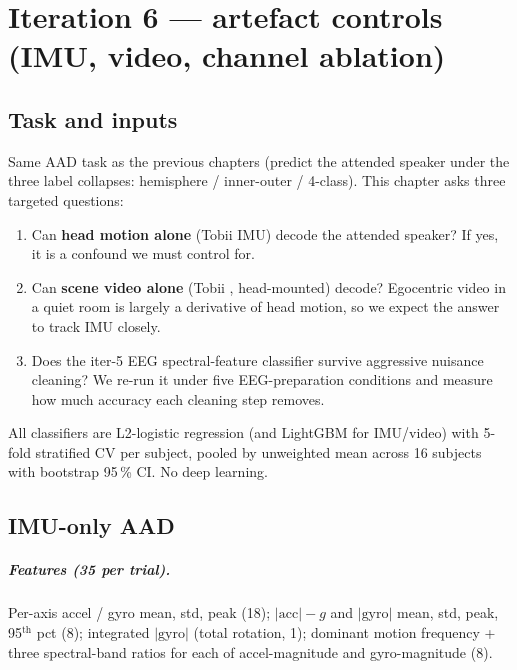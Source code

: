 \chapter{Iteration 6 --- artefact controls (IMU, video, channel ablation)}
\label{ch:iter6}

\section{Task and inputs}

Same AAD task as the previous chapters (predict the attended speaker
under the three label collapses: hemisphere / inner-outer / 4-class).
This chapter asks three targeted questions:

\begin{enumerate}
  \item Can \textbf{head motion alone} (Tobii IMU) decode the attended
        speaker? If yes, it is a confound we must control for.
  \item Can \textbf{scene video alone} (Tobii ,
        head-mounted) decode? Egocentric video in a quiet room is
        largely a derivative of head motion, so we expect the answer to
        track IMU closely.
  \item Does the iter-5 EEG spectral-feature classifier survive
        aggressive nuisance cleaning? We re-run it under five
        EEG-preparation conditions and measure how much accuracy each
        cleaning step removes.
\end{enumerate}

All classifiers are L2-logistic regression (and LightGBM for IMU/video)
with 5-fold stratified CV per subject, pooled by unweighted mean across
16 subjects with bootstrap 95\,\% CI. No deep learning.

\section{IMU-only AAD}

\paragraph{Features (35 per trial).}
Per-axis accel / gyro mean, std, peak (18); $|\text{acc}|{-}g$ and
$|\text{gyro}|$ mean, std, peak, 95$^\text{th}$ pct (8); integrated
$|\text{gyro}|$ (total rotation, 1); dominant motion frequency + three
spectral-band ratios for each of accel-magnitude and gyro-magnitude (8).

